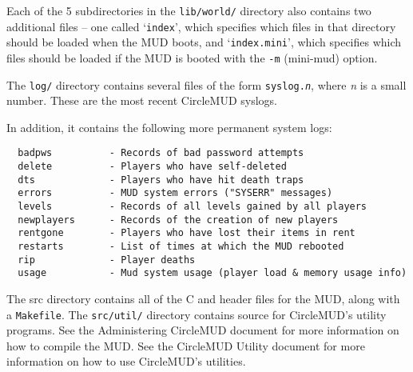 \documentclass[11pt]{article}
\begin{document}
Each of the 5 subdirectories in the \texttt{lib/world/} directory also contains two additional files -- one called `\texttt{index}', which specifies which files in that directory should be loaded when the MUD boots, and `\texttt{index.mini}', which specifies which files should be loaded if the MUD is booted with the \texttt{-m} (mini-mud) option.
\par
The \texttt{log/} directory contains several files of the form \texttt{syslog.{\it n}}, where {\it n} is a small number.  These are the most recent CircleMUD syslogs.
\par
In addition, it contains the following more permanent system logs:
\begin{verbatim}
  badpws          - Records of bad password attempts
  delete          - Players who have self-deleted
  dts             - Players who have hit death traps
  errors          - MUD system errors ("SYSERR" messages)
  levels          - Records of all levels gained by all players
  newplayers      - Records of the creation of new players
  rentgone        - Players who have lost their items in rent
  restarts        - List of times at which the MUD rebooted
  rip             - Player deaths
  usage           - Mud system usage (player load & memory usage info)
\end{verbatim}

The src directory contains all of the C and header files for the MUD, along with a \texttt{Makefile}.  The \texttt{src/util/} directory contains source for CircleMUD's utility programs.  See the Administering CircleMUD document for more information on how to compile the MUD.  See the CircleMUD Utility document for more information on how to use CircleMUD's utilities.
\end{document}
